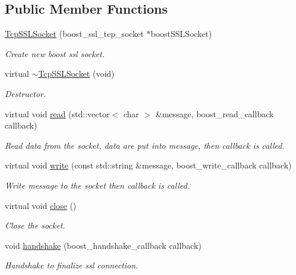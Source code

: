 \subsection*{Public Member Functions}
\begin{DoxyCompactItemize}
\item 
\hyperlink{class_tcp_s_s_l_socket_a0adab1e428716caaccfb7020c975d2c6}{Tcp\-S\-S\-L\-Socket} (boost\-\_\-ssl\-\_\-tcp\-\_\-socket $\ast$boost\-S\-S\-L\-Socket)
\begin{DoxyCompactList}\small\item\em Create new boost ssl socket. \end{DoxyCompactList}\item 
\hypertarget{class_tcp_s_s_l_socket_a7ccebf2c6ec77dc8354b0fe4792009f8}{virtual \hyperlink{class_tcp_s_s_l_socket_a7ccebf2c6ec77dc8354b0fe4792009f8}{$\sim$\-Tcp\-S\-S\-L\-Socket} (void)}\label{class_tcp_s_s_l_socket_a7ccebf2c6ec77dc8354b0fe4792009f8}

\begin{DoxyCompactList}\small\item\em Destructor. \end{DoxyCompactList}\item 
virtual void \hyperlink{class_tcp_s_s_l_socket_a5c91e917bfdefe91bfb85195b7f3c868}{read} (std\-::vector$<$ char $>$ \&message, boost\-\_\-read\-\_\-callback callback)
\begin{DoxyCompactList}\small\item\em Read data from the socket, data are put into message, then callback is called. \end{DoxyCompactList}\item 
virtual void \hyperlink{class_tcp_s_s_l_socket_a6b35535438fa43029629a0be9af6ae4a}{write} (const std\-::string \&message, boost\-\_\-write\-\_\-callback callback)
\begin{DoxyCompactList}\small\item\em Write message to the socket then callback is called. \end{DoxyCompactList}\item 
\hypertarget{class_tcp_s_s_l_socket_a34c302f3d74e46421f3cc670865d34b3}{virtual void \hyperlink{class_tcp_s_s_l_socket_a34c302f3d74e46421f3cc670865d34b3}{close} ()}\label{class_tcp_s_s_l_socket_a34c302f3d74e46421f3cc670865d34b3}

\begin{DoxyCompactList}\small\item\em Close the socket. \end{DoxyCompactList}\item 
void \hyperlink{class_tcp_s_s_l_socket_a851149cec83bb51e1a03c8a202a203f0}{handshake} (boost\-\_\-handshake\-\_\-callback callback)
\begin{DoxyCompactList}\small\item\em Handshake to finalize ssl connection. \end{DoxyCompactList}\end{DoxyCompactItemize}


